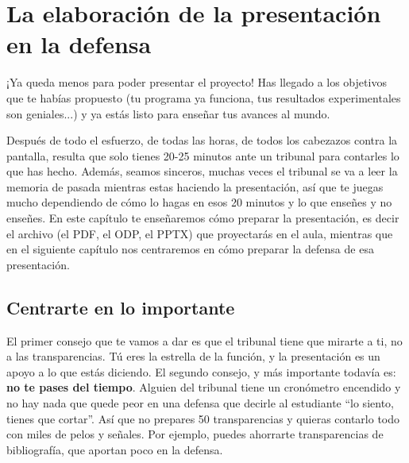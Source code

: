 \chapter{La elaboración de la presentación en la defensa} \label{cap:elaboraciónPresentación}


¡Ya queda menos para poder presentar el proyecto! Has llegado a los objetivos que te habías propuesto (tu programa ya funciona, tus resultados experimentales son geniales...) y ya estás listo para enseñar tus avances al mundo.

Después de todo el esfuerzo, de todas las horas, de todos los cabezazos contra la pantalla, resulta que solo tienes 20-25 minutos ante un tribunal para contarles lo que has hecho. Además, seamos sinceros, muchas veces el tribunal se va a leer la memoria de pasada mientras estas haciendo la presentación, así que te juegas mucho dependiendo de cómo lo hagas en esos 20 minutos y lo que enseñes y no enseñes. En este capítulo te enseñaremos cómo preparar la presentación, es decir el archivo (el PDF, el ODP, el PPTX) que proyectarás en el aula, mientras que en el siguiente capítulo nos centraremos en cómo preparar la defensa de esa presentación.

\section{Centrarte en lo importante}

El primer consejo que te vamos a dar es que el tribunal tiene que mirarte a ti, no a las transparencias. Tú eres la estrella de la función, y la presentación es un apoyo a lo que estás diciendo. El segundo consejo, y más importante todavía es: \textbf{no te pases del tiempo}. Alguien del tribunal tiene un cronómetro encendido y no hay nada que quede peor en una defensa que decirle al estudiante ``lo siento, tienes que cortar''. Así que no prepares 50 transparencias y quieras contarlo todo con miles de pelos y señales. Por ejemplo, puedes ahorrarte transparencias de bibliografía, que aportan poco en la defensa.


